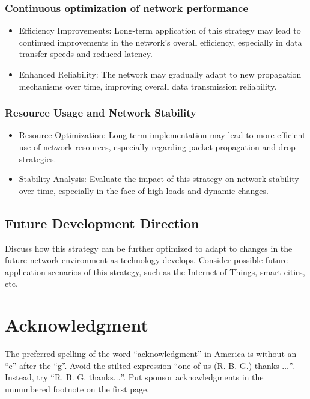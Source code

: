 \documentclass[conference]{IEEEtran}
\begin{document}
\subsubsection{Continuous optimization of network performance}
\begin{itemize}
    \item Efficiency Improvements: Long-term application of this strategy may lead to continued improvements in the network's overall efficiency, especially in data transfer speeds and reduced latency.
    \item Enhanced Reliability: The network may gradually adapt to new propagation mechanisms over time, improving overall data transmission reliability.
\end{itemize}

\subsubsection{Resource Usage and Network Stability}
\begin{itemize}
    \item Resource Optimization: Long-term implementation may lead to more efficient use of network resources, especially regarding packet propagation and drop strategies.
    \item Stability Analysis: Evaluate the impact of this strategy on network stability over time, especially in the face of high loads and dynamic changes.
\end{itemize}

\subsection{Future Development Direction}
Discuss how this strategy can be further optimized to adapt to changes in the future network environment as technology develops. Consider possible future application scenarios of this strategy, such as the Internet of Things, smart cities, etc.


\section*{Acknowledgment}

The preferred spelling of the word ``acknowledgment'' in America is without 
an ``e'' after the ``g''. Avoid the stilted expression ``one of us (R. B. 
G.) thanks $\ldots$''. Instead, try ``R. B. G. thanks$\ldots$''. Put sponsor 
acknowledgments in the unnumbered footnote on the first page.
\end{document}
